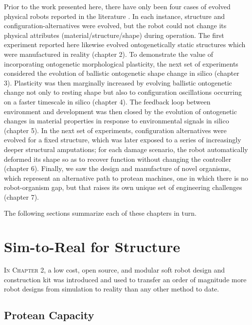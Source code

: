 Prior to the work presented here,
there have only been four cases of evolved physical robots reported in the literature
\cite{lipson2000automatic,hiller2012automatic,brodbeck2015morphological,cellucci20171d}.
In each instance, structure and configuration-alternatives were evolved, but the robot could not change its physical attributes (material/structure/shape) during operation.
The first experiment reported here likewise evolved ontogenetically static structures which were manufactured in reality (chapter 2).
To demonstrate 
the value of incorporating ontogenetic morphological plasticity,
the next set of experiments considered
the evolution of ballistic ontogenetic shape change in silico (chapter 3).
Plasticity was then marginally increased by
evolving ballistic ontogenetic change not only to resting shape but also to configuration oscillations occurring on a faster timescale in silico (chapter 4).
The feedback loop between environment and development was then closed by
the evolution of ontogenetic changes in material properties in response to environmental signals in silico (chapter 5).
In the next set of experiments,
configuration alternatives were evolved for a fixed structure,
which was later exposed to a series of 
increasingly deeper structural amputations;
for each damage scenario, the robot automatically deformed its shape so as to recover function without changing the controller (chapter 6).
Finally, we saw the design and manufacture of novel organisms, which represent an alternative path to protean machines, one in which there is no robot-organism gap, but that raises its own unique set of engineering challenges (chapter 7).

The following sections summarize each of these 
chapters in turn.


\section{Sim-to-Real for Structure}

\textsc{In Chapter 2,}
a low cost, open source, and modular soft robot design and construction kit was introduced and used to
transfer an order of magnitude more robot designs from simulation to reality than any other method to date.

\subsection{Protean Capacity}

